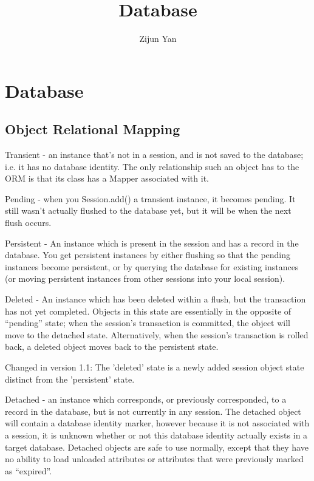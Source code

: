 \documentclass[oneside,reqno]{amsbook}
\title{Database}
\author{Zijun Yan}
\begin{document}
\maketitle

\part{Database}

\chapter{Object Relational Mapping}

Transient - an instance that's not in a session, and is not saved to the
database; i.e. it has no database identity. The only relationship such an object
has to the ORM is that its class has a Mapper associated with it. 

Pending - when you Session.add() a transient instance, it becomes pending. It
still wasn't actually flushed to the database yet, but it will be when the next
flush occurs. 

Persistent - An instance which is present in the session and has a record in the
database. You get persistent instances by either flushing so that the pending
instances become persistent, or by querying the database for existing instances
(or moving persistent instances from other sessions into your local session).

Deleted - An instance which has been deleted within a flush, but the transaction
has not yet completed. Objects in this state are essentially in the opposite of
“pending” state; when the session's transaction is committed, the object will
move to the detached state. Alternatively, when the session's transaction is
rolled back, a deleted object moves back to the persistent state.

Changed in version 1.1: The 'deleted' state is a newly added session object
state distinct from the 'persistent' state.

Detached - an instance which corresponds, or previously corresponded, to a
record in the database, but is not currently in any session. The detached object
will contain a database identity marker, however because it is not associated
with a session, it is unknown whether or not this database identity actually
exists in a target database. Detached objects are safe to use normally, except
that they have no ability to load unloaded attributes or attributes that were
previously marked as “expired”.
\end{document}
